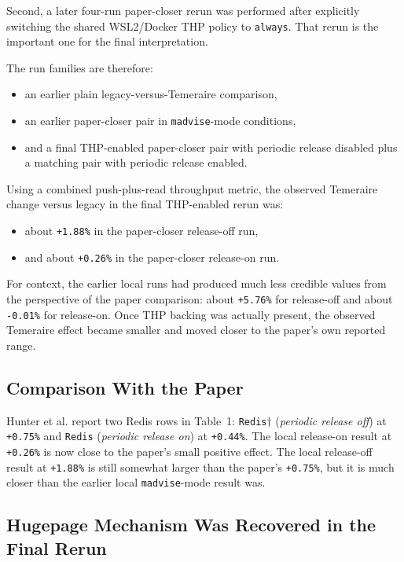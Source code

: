 \documentclass[a4paper,11pt]{article}
\begin{document}
Second, a later four-run paper-closer rerun was performed after explicitly
switching the shared WSL2/Docker THP policy to \texttt{always}. That rerun is
the important one for the final interpretation.

The run families are therefore:

\begin{itemize}[leftmargin=1.5em]
  \item an earlier plain legacy-versus-Temeraire comparison,
  \item an earlier paper-closer pair in \texttt{madvise}-mode conditions,
  \item and a final THP-enabled paper-closer pair with periodic release
  disabled plus a matching pair with periodic release enabled.
\end{itemize}

Using a combined push-plus-read throughput metric, the observed Temeraire
change versus legacy in the final THP-enabled rerun was:

\begin{itemize}[leftmargin=1.5em]
  \item about \texttt{+1.88\%} in the paper-closer release-off run,
  \item and about \texttt{+0.26\%} in the paper-closer release-on run.
\end{itemize}

For context, the earlier local runs had produced much less credible values from
the perspective of the paper comparison: about \texttt{+5.76\%} for release-off
and about \texttt{-0.01\%} for release-on. Once THP backing was actually
present, the observed Temeraire effect became smaller and moved closer to the
paper's own reported range.

\subsection{Comparison With the Paper}

Hunter et al. report two Redis rows in Table~1: \texttt{Redis$\dagger$}
(\textit{periodic release off}) at \texttt{+0.75\%} and \texttt{Redis}
(\textit{periodic release on}) at \texttt{+0.44\%}. The local release-on result
at \texttt{+0.26\%} is now close to the paper's small positive effect. The
local release-off result at \texttt{+1.88\%} is still somewhat larger than the
paper's \texttt{+0.75\%}, but it is much closer than the earlier local
\texttt{madvise}-mode result was.

\subsection{Hugepage Mechanism Was Recovered in the Final Rerun}
\end{document}
